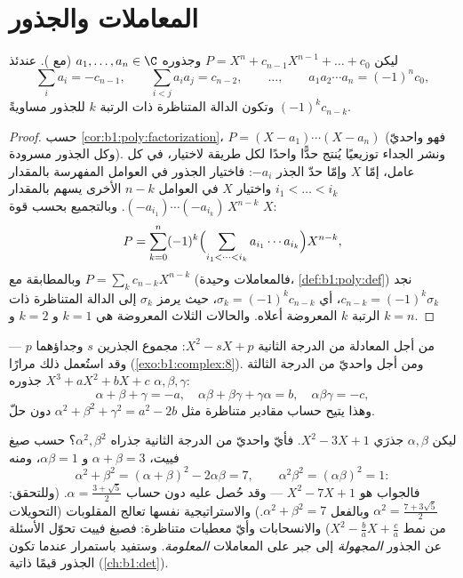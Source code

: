 \section{المعاملات والجذور}

\begin{theorem}\label{thm:b1:poly:vieta}
ليكن $P = X^n + c_{n-1} X^{n-1} + \dots + c_0$  وجذوره
$a_1, \dots, a_n \in \C$ (مع ). عندئذ
\[
\sum_i a_i = -c_{n-1},
\qquad
\sum_{i < j} a_i a_j = c_{n-2},
\qquad \dots, \qquad
a_1 a_2 \cdots a_n = (-1)^n c_0 ,
\]
وتكون الدالة المتناظرة ذات الرتبة $k$ للجذور مساويةً $(-1)^k c_{n-k}$.
\end{theorem}

\begin{proof}
حسب \cref{cor:b1:poly:factorization}، $P = (X - a_1)\cdots(X -
a_n)$ (فهو واحديّ وكل الجذور مسرودة). ونشر الجداء
توزيعيًا يُنتج حدًّا واحدًا لكل طريقة لاختيار، في كل
عامل، إمّا $X$ وإمّا حدّ الجذر $-a_i$: فاختيار الجذور في
العوامل المفهرسة بالمقدار $i_1 < \dots < i_k$ واختيار $X$ في العوامل
$n - k$ الأخرى يسهم بالمقدار $(-a_{i_1})\cdots(-a_{i_k})\,X^{n-k}$. وبالتجميع
بحسب قوة $X$:
\[
P = \sum_{k=0}^{n} (-1)^k
\Bigl(\sum_{i_1 < \dots < i_k} a_{i_1}\cdots a_{i_k}\Bigr)
X^{n-k} ,
\]
وبالمطابقة مع $P = \sum_k c_{n-k}X^{n-k}$ (فالمعاملات
وحيدة، \cref{def:b1:poly:def}) نجد $c_{n-k} = (-1)^k
\sigma_k$، أي $\sigma_k = (-1)^kc_{n-k}$، حيث يرمز $\sigma_k$
إلى الدالة المتناظرة ذات الرتبة $k$ المعروضة أعلاه. والحالات
الثلاث المعروضة هي $k = 1$ و $k = 2$ و $k = n$.
\end{proof}

\begin{example}\label{ex:b1:poly:vieta}
من أجل المعادلة من الدرجة الثانية $X^2 - sX + p$: مجموع الجذرين $s$ وجداؤهما $p$ ---
وقد استُعمل ذلك مرارًا (\cref{exo:b1:complex:8}). ومن أجل  واحديّ من الدرجة الثالثة
$X^3 + aX^2 + bX + c$ جذوره $\alpha, \beta, \gamma$:
\[
\alpha + \beta + \gamma = -a,
\quad
\alpha\beta + \beta\gamma + \gamma\alpha = b,
\quad
\alpha\beta\gamma = -c ,
\]
وهذا يتيح حساب مقادير متناظرة مثل $\alpha^2 + \beta^2
+ \gamma^2 = a^2 - 2b$ دون حلّ.
\end{example}

\begin{example}\label{ex:b1:poly:transformroots}
ليكن $\alpha, \beta$ جذرَي $X^2 - 3X + 1$. فأيّ  واحديّ
من الدرجة الثانية جذراه $\alpha^2, \beta^2$؟ حسب صيغ فييت، $\alpha +
\beta = 3$ و $\alpha\beta = 1$، ومنه
\[
\alpha^2 + \beta^2 = (\alpha+\beta)^2 - 2\alpha\beta = 7,
\qquad
\alpha^2\beta^2 = (\alpha\beta)^2 = 1 :
\]
فالجواب هو $X^2 - 7X + 1$ --- وقد حُصل عليه دون حساب
$\alpha = \frac{3 + \sqrt5}2$. (وللتحقق: $\alpha^2 = \frac{7 +
3\sqrt5}2$ وبالفعل $\alpha^2 + \beta^2 = 7$.) والاستراتيجية
نفسها تعالج المقلوبات (التحويلات من نمط $X^2 - \frac ba X + \frac
ca$) والانسحابات وأيّ معطيات متناظرة: فصيغ فييت
تحوّل الأسئلة عن الجذور \emph{المجهولة} إلى جبر على
المعاملات \emph{المعلومة}. وستفيد باستمرار عندما تكون
الجذور قيمًا ذاتية (\cref{ch:b1:det}).
\end{example}


